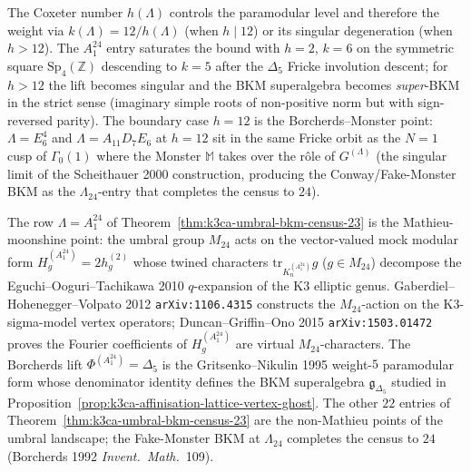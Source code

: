 \begin{remark}
\label{rem:k3ca-coxeter-weight-fricke-reciprocity}
The Coxeter number $h(\Lambda)$ controls the paramodular level
and therefore the weight via $k(\Lambda)=12/h(\Lambda)$ (when
$h\mid 12$) or its singular degeneration (when $h>12$). The
$A_1^{24}$ entry saturates the bound with $h=2$, $k=6$ on the
symmetric square $\mathrm{Sp}_4(\mathbb Z)$ descending to $k=5$
after the $\Delta_5$ Fricke involution descent; for $h>12$ the
lift becomes singular and the BKM superalgebra becomes
\emph{super}-BKM in the strict sense (imaginary simple roots of
non-positive norm but with sign-reversed parity). The boundary
case $h=12$ is the Borcherds--Monster point:
$\Lambda=E_6^4$ and $\Lambda=A_{11}D_7E_6$ at $h=12$ sit in the
same Fricke orbit as the $N=1$ cusp of $\Gamma_0(1)$ where the
Monster $\mathbb M$ takes over the r\^ole of $G^{(\Lambda)}$ (the
singular limit of the Scheithauer 2000 construction, producing
the Conway/Fake-Monster BKM as the $\Lambda_{24}$-entry that
completes the census to $24$).
\end{remark}

\begin{remark}
\label{rem:k3ca-a1-24-mathieu-moonshine}
The row $\Lambda=A_1^{24}$ of Theorem~\ref{thm:k3ca-umbral-bkm-census-23}
is the Mathieu-moonshine point: the umbral group $M_{24}$ acts on the
vector-valued mock modular form
$H^{(A_1^{24})}_g=2h^{(2)}_g$ whose twined characters
$\mathrm{tr}_{K^{(A_1^{24})}_n}g$ ($g\in M_{24}$) decompose the
Eguchi--Ooguri--Tachikawa 2010 $q$-expansion of the K3 elliptic
genus. Gaberdiel--Hohenegger--Volpato 2012 \texttt{arXiv:1106.4315}
constructs the $M_{24}$-action on the K3-sigma-model vertex
operators; Duncan--Griffin--Ono 2015 \texttt{arXiv:1503.01472}
proves the Fourier coefficients of $H^{(A_1^{24})}_g$ are virtual
$M_{24}$-characters. The Borcherds lift
$\Phi^{(A_1^{24})}=\Delta_5$ is the Gritsenko--Nikulin 1995
weight-$5$ paramodular form whose denominator identity defines
the BKM superalgebra $\mathfrak g_{\Delta_5}$ studied in
Proposition~\ref{prop:k3ca-affinisation-lattice-vertex-ghost}. The
other $22$ entries of
Theorem~\ref{thm:k3ca-umbral-bkm-census-23} are the non-Mathieu
points of the umbral landscape; the Fake-Monster BKM at
$\Lambda_{24}$ completes the census to $24$ (Borcherds 1992
\emph{Invent.~Math.}~109).
\end{remark}

